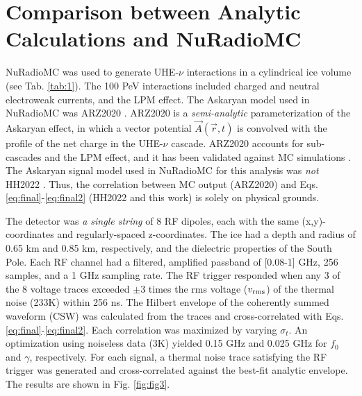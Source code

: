 \documentclass[amsmath,amssymb,aps,prd,10pt,twocolumn,showkeys]{revtex4}
\begin{document}
\section{Comparison between Analytic Calculations and NuRadioMC}
\label{sec:sim}

NuRadioMC was used to generate UHE-$\nu$ interactions in a cylindrical ice volume (see Tab. \ref{tab:1}).  The 100 PeV interactions included charged and neutral electroweak currents, and the LPM effect.  The Askaryan model used in NuRadioMC was ARZ2020 \cite{PhysRevD.101.083005}.  ARZ2020 is a \textit{semi-analytic} parameterization of the Askaryan effect, in which a vector potential $\vec{A}(\vec{r},t)$ is convolved with the profile of the net charge in the UHE-$\nu$ cascade.  ARZ2020 accounts for sub-cascades and the LPM effect, and it has been validated against MC simulations \cite{zhs,10.1103/physrevd.84.103003}.  The Askaryan signal model used in NuRadioMC for this analysis was \textit{not} HH2022 \cite{PhysRevD.105.123019}.  Thus, the correlation between MC output (ARZ2020) and Eqs. \ref{eq:final}-\ref{eq:final2} (HH2022 and this work) is solely on physical grounds.

The detector was \textit{a single string} of 8 RF dipoles, each with the same (x,y)-coordinates and regularly-spaced z-coordinates.  The ice had a depth and radius of 0.65 km and 0.85 km, respectively, and the dielectric properties of the South Pole.  Each RF channel had a filtered, amplified passband of [0.08-1] GHz, 256 samples, and a 1 GHz sampling rate.  The RF trigger responded when any 3 of the 8 voltage traces exceeded $\pm 3$ times the rms voltage ($v_{\rm rms}$) of the thermal noise (233K) within 256 ns.  The Hilbert envelope of the coherently summed waveform (CSW) was calculated from the traces and cross-correlated with Eqs. \ref{eq:final}-\ref{eq:final2}.  Each correlation was maximized by varying $\sigma_t$.  An optimization using noiseless data (3K) yielded 0.15 GHz and 0.025 GHz for $f_0$ and $\gamma$, respectively.  For each signal, a thermal noise trace satisfying the RF trigger was generated and cross-correlated against the best-fit analytic envelope.  The results are shown in Fig. \ref{fig:fig3}.
\end{document}
